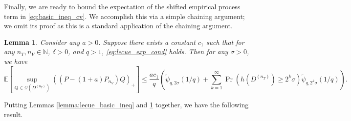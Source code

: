 \documentclass[10pt]{book}
\newtheorem{lemma}{Lemma}
\theoremstyle{definition}
\begin{document}
Finally, we are ready to bound the expectation of the shifted empirical process term in \eqref{eq:basic_ineq_cv}.
We accomplish this via a simple chaining argument; we omit its proof as this is a standard application of the chaining argument.
\begin{lemma}
	\label{lemma:chain}
Consider any $a>0$.
Suppose there exists a constant $c_{1}$ such that for any $n_{T},n_{V} \in \mathbb{N}$, $\delta>0$,
and $q>1$, \eqref{eq:lecue_exp_cond} holds.
Then for any $\sigma > 0$, we have
\[
\mathbb{E}\left[\sup_{Q\in\mathcal{Q}(D^{(n_{T})})}\left(\left({P}-(1+a)P_{n_{V}}\right)Q\right)_{+}\right]
\le
\frac{ac_1}{q}
\left(
\tilde{\psi}_{q,2\sigma}(1/q)
+\sum_{k=1}^{\infty}\Pr\left(h\left(D^{(n_{T})}\right)\ge2^{k}\sigma\right)
\tilde{\psi}_{q,2^{k}\sigma}(1/q)
\right)
.
\]
\end{lemma}
Putting Lemmas \ref{lemma:lecue_basic_ineq} and \ref{lemma:chain} together, we have the following result.
\end{document}
